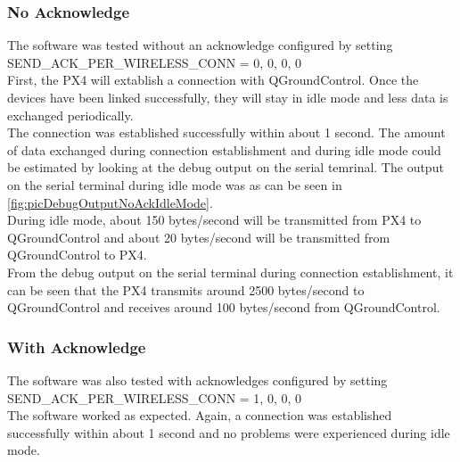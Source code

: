 \subsubsection{No Acknowledge}
%
The software was tested without an acknowledge configured by setting SEND\_ACK\_PER\_WIRELESS\_CONN = 0, 0, 0, 0\\
First, the PX4 will extablish a connection with QGroundControl. Once the devices have been linked successfully, they will stay in idle mode and less data is exchanged periodically.\\
The connection was established successfully within about 1 second. The amount of data exchanged during connection establishment and during idle mode could be estimated by looking at the debug output on the serial temrinal. The output on the serial terminal during idle mode was as can be seen in \autoref{fig:picDebugOutputNoAckIdleMode}. \\
During idle mode, about 150 bytes/second will be transmitted from PX4 to QGroundControl and about 20 bytes/second will be transmitted from QGroundControl to PX4.\\
From the debug output on the serial terminal during connection establishment, it can be seen that the PX4 transmits around 2500 bytes/second to QGroundControl and receives around 100 bytes/second from QGroundControl.
%
\subsubsection{With Acknowledge}
The software was also tested with acknowledges configured by setting SEND\_ACK\_PER\_WIRELESS\_CONN = 1, 0, 0, 0\\
The software worked as expected. Again, a connection was established successfully within about 1 second and no problems were experienced during idle mode.
%
%
%
%
